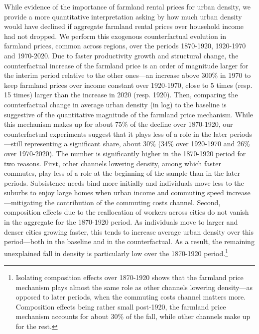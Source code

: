\documentclass[./20250130-paper.tex]{subfiles}
\begin{document}
While evidence of the importance of farmland rental prices for urban density, we provide a more quantitative interpretation asking by how much urban density would have declined if aggregate farmland rental prices over household income had not dropped. We perform this exogenous counterfactual evolution in farmland prices, common across regions, over the periods 1870-1920, 1920-1970 and 1970-2020. Due to faster productivity growth and structural change, the counterfactual increase of the farmland price is an order of magnitude larger for the interim period relative to the other ones---an increase above 300\% in 1970 to keep farmland prices over income constant over 1920-1970, close to 5 times (resp. 15 times) larger than the increase in 2020 (resp. 1920). Then, comparing the counterfactual change in average urban density (in log) to the baseline is suggestive of the quantitative magnitude of the farmland price mechanism. While this mechanism makes up for about 75\% of the decline over 1870-1920, our counterfactual experiments suggest that it plays less of a role in the later periods---still representing a significant share, about 30\% (34\% over 1920-1970 and 26\% over 1970-2020). The number is significantly higher in the 1870-1920 period for two reasons. First, other channels lowering density, among which faster commutes, play less of a role at the beginning of the sample than in the later periods. Subsistence needs bind more initially and individuals move less to the suburbs to enjoy large homes when urban income and commuting speed increase---mitigating the contribution of the commuting costs channel. Second, composition effects due to the reallocation of workers across cities do not vanish in the aggregate for the 1870-1920 period. As individuals move to larger and denser cities growing faster, this tends to increase average urban density over this period---both in the baseline and in the counterfactual. As a result, the remaining unexplained fall in density is particularly low over the 1870-1920 period.\footnote{Isolating composition effects over 1870-1920 shows that the farmland price mechanism plays almost the same role as other channels lowering density---as opposed to later periods, when the commuting costs channel matters more. Composition effects being rather small post-1920, the farmland price mechanism accounts for about 30\% of the fall, while other channels make up for the rest.}





\end{document}
